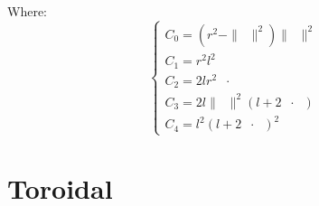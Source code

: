 \documentclass[10pt,a4paper]{article}
\newcommand{\ud}[1]{\underline{#1}}
\DeclareMathOperator{\OA}{\ud{OA}}
\DeclareMathOperator{\e}{\ud{e}}
\begin{document}
Where:
$$
\left\{
\begin{array}{llll}
    C_0 = (r^2 - \|\OA\|^2)\|\OA\|^2\\
    C_1 = r^2l^2\\
    C_2 = 2lr^2\OA\cdot\e\\
    C_3 = 2l\|\OA\|^2(l + 2\OA\cdot\e)\\
    C_4 = l^2(l + 2\OA\cdot\e)^2
\end{array}
\right.
$$

\newpage
\section{Toroidal}
\end{document}
